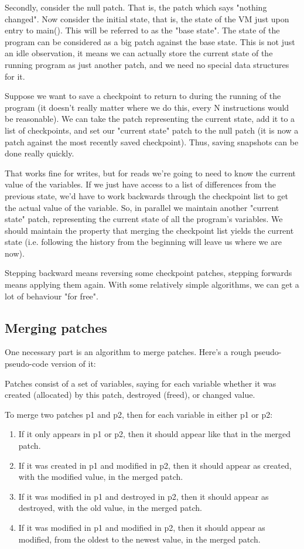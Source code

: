 \documentclass[10pt,a4paper]{report}
\begin{document}
Secondly, consider the null patch. That is, the patch which says "nothing changed". Now consider the initial state, that is, the state of the VM just upon entry to main(). This will be referred to as the "base state". The state of the program can be considered as a big patch against the base state. This is not just an idle observation, it means we can actually store the current state of the running program as just another patch, and we need no special data structures for it.

Suppose we want to save a checkpoint to return to during the running of the program (it doesn't really matter where we do this, every N instructions would be reasonable). We can take the patch representing the current state, add it to a list of checkpoints, and set our "current state" patch to the null patch (it is now a patch against the most recently saved checkpoint). Thus, saving snapshots can be done really quickly.

That works fine for writes, but for reads we're going to need to know the current value of the variables. If we just have access to a list of differences from the previous state, we'd have to work backwards through the checkpoint list to get the actual value of the variable. So, in parallel we maintain another "current state" patch, representing the current state of all the program's variables. We should maintain the property that merging the checkpoint list yields the current state (i.e. following the history from the beginning will leave us where we are now).

Stepping backward means reversing some checkpoint patches, stepping forwards means applying them again. With some relatively simple algorithms, we can get a lot of behaviour "for free".

\subsection{Merging patches}
One necessary part is an algorithm to merge patches. Here's a rough pseudo-pseudo-code version of it:

Patches consist of a set of variables, saying for each variable whether it was created (allocated) by this patch, destroyed (freed), or changed value.

To merge two patches p1 and p2, then for each variable in either p1 or p2:

\begin{enumerate}
\item If it only appears in p1 or p2, then it should appear like that in the merged patch.
\item If it was created in p1 and modified in p2, then it should appear as created, with the modified value, in the merged patch.
\item If it was modified in p1 and destroyed in p2, then it should appear as destroyed, with the old value, in the merged patch.
\item If it was modified in p1 and modified in p2, then it should appear as modified, from the oldest to the newest value, in the merged patch. 
\end{enumerate}
\end{document}

